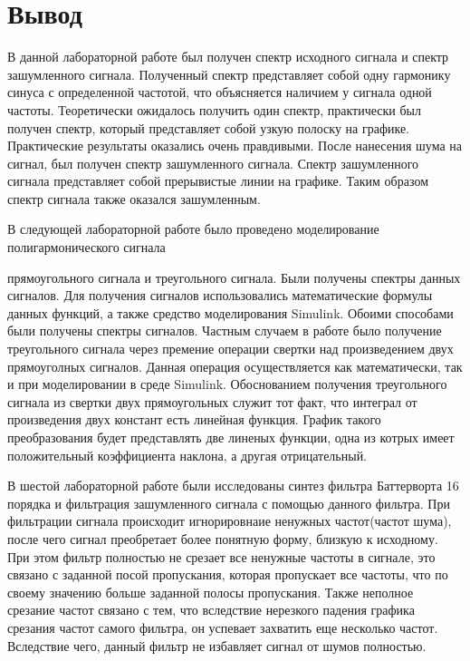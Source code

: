 \documentclass[10pt,a4paper]{report}
\begin{document}
\chapter{Вывод}
В данной лабораторной работе был получен спектр исходного сигнала и спектр зашумленного сигнала. Полученный спектр представляет собой одну гармонику синуса с определенной частотой, что объясняется наличием у сигнала одной частоты. Теоретически ожидалось получить один спектр, практически был получен спектр, который представляет собой узкую полоску на графике. Практические результаты оказались очень правдивыми. После нанесения шума на сигнал, был получен спектр зашумленного сигнала. Спектр зашумленного сигнала представляет собой прерывистые линии на графике. Таким образом спектр сигнала также оказался зашумленным. \newline

В следующей лабораторной работе было проведено моделирование полигармонического сигнала

 прямоугольного сигнала и треугольного сигнала. Были получены спектры данных сигналов. Для получения сигналов использовались математические формулы данных функций, а также средство моделирования Simulink. Обоими способами были получены спектры сигналов. Частным случаем в работе было получение треугольного сигнала через премение операции свертки над произведением двух прямоуголных сигналов. Данная операция осуществляется как математически, так и при моделировании в среде Simulink.
Обоснованием получения треугольного сигнала из свертки двух прямоугольных служит тот факт, что интеграл от произведения двух констант есть линейная функция. График такого преобразования будет представлять две линеных функции, одна из котрых имеет положительный коэффициента наклона, а другая отрицательный.

В шестой лабораторной работе были исследованы синтез фильтра Баттерворта 16 порядка и фильтрация зашумленного сигнала с помощью данного фильтра.
При фильтрации сигнала происходит игнорировнаие ненужных частот(частот шума), после чего сигнал преобретает более понятную форму, близкую к исходному. При этом фильтр
полностью не срезает все ненужные частоты в сигнале, это связано с заданной посой пропускания, которая пропускает все частоты, что по своему значению больше заданной полосы пропускания.
Также неполное срезание частот связано с тем, что вследствие нерезкого падения графика срезания частот самого фильтра, он успевает захватить еще несколько частот. 
Вследствие чего, данный фильтр не избавляет сигнал от шумов полностью.
\end{document}
